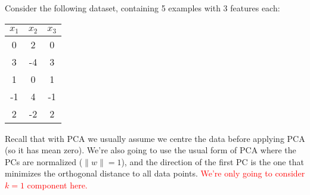\documentclass{article}
\newcommand{\red}[1]{\textcolor{red}{#1}}
\let\update\red
\newcommand{\norm}[1]{\lVert #1 \rVert}
\begin{document}
Consider the following dataset, containing 5 examples with 3 features each:
\begin{center}
  \begin{tabular}{ccc}
    $x_1$ & $x_2$ & $x_3$ \\
    \hline
     0 &  2 &  0 \\
     3 & -4 &  3 \\
     1 &  0 &  1 \\
    -1 &  4 & -1 \\
     2 & -2 &  2 \\
  \end{tabular}
\end{center}
Recall that with PCA we usually assume we centre the data before applying PCA (so it has mean zero).
We're also going to use the usual form of PCA where the PCs are normalized ($\norm{w} = 1$),
and the direction of the first PC is the one that minimizes the orthogonal distance to all data points.
\update{We're only going to consider $k = 1$ component here.}
\end{document}
